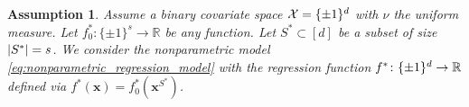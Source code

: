 \documentclass[11pt]{article}
\newtheorem{assumption}[theorem]{Assumption}
\newcommand{\bx}{\mathbf{x}}
\DeclarePairedDelimiter{\braces}{\lbrace}{\rbrace}
\DeclarePairedDelimiter{\abs}{|}{|}
\newcommand{\R}{\mathbb{R}}
\renewcommand{\xspace}{\mathcal{X}}
\newcommand{\binspace}{\braces{\pm 1}^\nfeats}
\newcommand{\xmeasure}{\nu}
\newcommand{\sparsity}{s}
\newcommand{\nfeats}{d}
\newcommand{\coordindices}{[\nfeats]}
\newcommand{\funcclass}{\mathfrak{F}}
\newcommand{\suppset}{S^*}
\newcommand{\sparsefuncs}{\funcclass_\sparsity}
\begin{document}

\begin{assumption}
    \label{assumption}
    Assume a binary covariate space $\xspace = \binspace$ with $\xmeasure$ the uniform measure.
    Let $f^*_0\colon \lbrace\pm 1\rbrace^\sparsity \to \R$ be any function.
    Let $\suppset \subset \coordindices$ be a subset of size $\abs*{\suppset} = \sparsity$.
    We consider the nonparametric model \eqref{eq:nonparametric_regression_model} with the regression function $f^*\colon \binspace \to \R$ defined via $f^*(\bx) = f^*_0(\bx^{\suppset})$.
\end{assumption}

\end{document}
